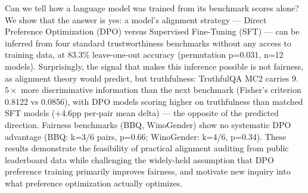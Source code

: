 
Can we tell how a language model was trained from its benchmark scores alone?
We show that the answer is yes: a model's alignment strategy --- Direct Preference
Optimization (DPO) versus Supervised Fine-Tuning (SFT) --- can be inferred from four
standard trustworthiness benchmarks without any access to training data, at 83.3\%
leave-one-out accuracy (permutation p=0.031, n=12 models). Surprisingly, the
signal that makes this inference possible is not fairness, as alignment theory
would predict, but truthfulness: TruthfulQA MC2 carries 9.$5\times$ more discriminative
information than the next benchmark (Fisher's criterion 0.8122 vs 0.0856), with
DPO models scoring higher on truthfulness than matched SFT models
(+4.6pp per-pair mean delta) --- the opposite of the predicted direction. Fairness
benchmarks (BBQ, WinoGender) show no systematic DPO advantage (BBQ: k=3/6 pairs,
p=0.66; WinoGender: k=4/6, p=0.34). These results demonstrate the feasibility of
practical alignment auditing from public leaderboard data while challenging the
widely-held assumption that DPO preference training primarily improves fairness,
and motivate new inquiry into what preference optimization actually optimizes.

